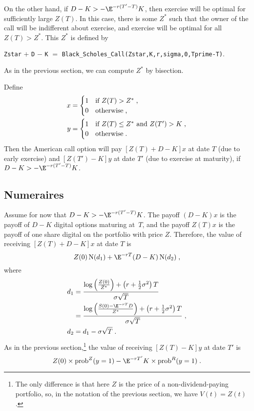 On the other hand, if $D-K > -\E^{-r(T'-T)}K$, then exercise will be optimal for sufficiently large $Z(T)$.  In this case, there is some
$Z^*$ such that the owner of the call will be indifferent about exercise, and exercise will be optimal for \vfil\eject
all $Z(T)>Z^*$.  This $Z^*$ is defined by
\begin{center}
\verb!Zstar! $+$ \verb!D! $-$ \verb!K! $=$ \verb!Black_Scholes_Call(Zstar,K,r,sigma,0,Tprime-T)!\;.
\end{center}
As in the previous section, we can compute $Z^*$ by bisection.  

Define
\begin{align*}
x&= \begin{cases} 1 &\text{if $Z(T)>Z^*$\;,}\\
                               0 & \text{otherwise\;,}
        \end{cases}\\
y&= \begin{cases} 1 &\text{if $Z(T)\leq Z^*$ and $Z(T')>K$\;,}\\
                               0 & \text{otherwise\;.}
        \end{cases} 
\end{align*} 
Then the American call option will pay $[Z(T)+D-K]x$ at date $T$ (due to early exercise) and $[Z(T')-K]y$ at date $T'$ (due to exercise at maturity), if $D-K > -\E^{-r(T'-T)}K$.  

\subsection*{Numeraires}
Assume for now that $D-K > -\E^{-r(T'-T)}K$.  The payoff $(D-K)x$ is the payoff of $D-K$ digital options maturing at~$T$, and the payoff $Z(T)x$ is the payoff of one share digital on the portfolio with price $Z$.  Therefore, the value of receiving  $[Z(T)+D-K]x$ at date $T$ is
$$Z(0)\N(d_1) + \E^{-rT}(D-K)\N(d_2)\; ,$$
where
\begin{subequations}\label{americancallstarcombined}
\begin{align}
d_1 &= \frac{\log\left(\frac{Z(0)}{Z^*}\right)+\left(r+\frac{1}{2}\sigma^2\right)T}{\sigma\sqrt{T}}\notag\\
&= \frac{\log\left(\frac{S(0)-\E^{-rT}D}{Z^*}\right)+\left(r+\frac{1}{2}\sigma^2\right)T}{\sigma\sqrt{T}} \;,\label{americancalld1star}\\
d_2&=d_1-\sigma\sqrt{T}\;.\label{americancalld2star}
\end{align}\end{subequations}
As in the previous section,\footnote{The only difference is that here $Z$ is the price of a non-dividend-paying portfolio, so, in the notation of the previous section, we have $V(t)=Z(t)$.} the value of receiving $[Z(T)-K]y$ at date $T'$ is 
$$Z(0)\times \text{prob}^Z(y=1) - \E^{-rT'}K\times \text{prob}^R(y=1)\; .$$

